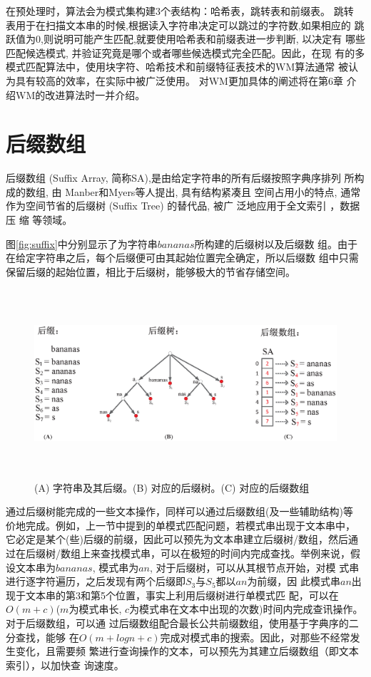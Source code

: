 在预处理时，算法会为模式集构建3个表结构：哈希表，跳转表和前缀表。 跳转
表用于在扫描文本串的时候,根据读入字符串决定可以跳过的字符数,如果相应的
跳跃值为0,则说明可能产生匹配,就要使用哈希表和前缀表进一步判断, 以决定有
哪些匹配候选模式, 并验证究竟是哪个或者哪些候选模式完全匹配。因此，在现
有的多模式匹配算法中，使用块字符、哈希技术和前缀特征表技术的WM算法通常
被认为具有较高的效率，在实际中被广泛使用。 对WM更加具体的阐述将在第6章
介绍WM的改进算法时一并介绍。

\section{后缀数组}


后缀数组 (Suffix Array, 简称SA),是由给定字符串的所有后缀按照字典序排列
所构成的数组, 由 Manber和Myers等人提出\cite{Manber1993}, 具有结构紧凑且
空间占用小的特点, 通常作为空间节省的后缀树 (Suffix Tree) 的替代品, 被广
泛地应用于全文索引 \cite{Strate2015,Fischer2017,Arroyuelo2014}，数据压
缩\cite{Louza2015,Chien2015,Pradhan2016,Brisaboa2015} 等领域。

图\ref{fig:suffix}中分别显示了为字符串$bananas$所构建的后缀树以及后缀数
组。由于在给定字符串之后，每个后缀便可由其起始位置完全确定，所以后缀数
组中只需保留后缀的起始位置，相比于后缀树，能够极大的节省存储空间。


\begin{figure}[!h]
  \centering
  \includegraphics[height=7cm ,width=15cm]{figures/1_Introduction/Suffix.eps}
  \caption{(A) 字符串及其后缀。(B) 对应的后缀树。(C) 对应的后缀数组}
  \label{fig:Suffix}
\end{figure}

通过后缀树能完成的一些文本操作，同样可以通过后缀数组(及一些辅助结构)等
价地完成。例如，上一节中提到的单模式匹配问题，若模式串出现于文本串中，
它必定是某个(些)后缀的前缀，因此可以预先为文本串建立后缀树/数组，然后通
过在后缀树/数组上来查找模式串，可以在极短的时间内完成查找。举例来说，假
设文本串为$bananas$, 模式串为$an$, 对于后缀树，可以从其根节点开始，对模
式串进行逐字符遍历，之后发现有两个后缀即$S_3$与$S_5$都以$an$为前缀，因
此模式串$an$出现于文本串的第3和第5个位置，事实上利用后缀树进行单模式匹
配，可以在$O(m+c)$($m$为模式串长,
$c$为模式串在文本中出现的次数)时间内完成查讯操作。对于后缀数组，可以通
过后缀数组配合最长公共前缀数组，使用基于字典序的二分查找，能够
在$O(m+logn+c)$完成对模式串的搜索。因此，对那些不经常发生变化，且需要频
繁进行查询操作的文本，可以预先为其建立后缀数组（即文本索引），以加快查
询速度。


